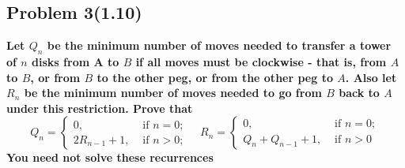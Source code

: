 \subsection{Problem 3(1.10)}
\textbf{Let $Q_n$ be the minimum number of moves needed to transfer a tower of $n$ disks from A to $B$ if all moves must be clockwise - that is, from $A$ to $B$, or from $B$ to the other peg, or from the other peg to $A$. Also let $R_n$ be the minimum number of moves needed to go from $B$ back to $A$ under this restriction. Prove that
$$
Q_n=\left\{\begin{array}{ll}
0, & \text { if } n=0 ; \\
2 R_{n-1}+1, & \text { if } n>0 ;
\end{array} \quad R_n=\left\{\begin{array}{ll}
0, & \text { if } n=0 ; \\
Q_n+Q_{n-1}+1, & \text { if } n>0
\end{array}\right.\right.
$$
You need not solve these recurrences}
\par
